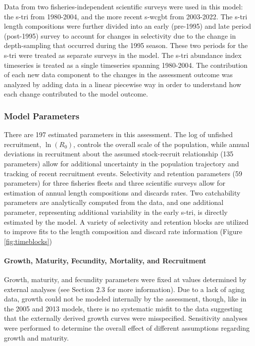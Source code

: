 \documentclass[11pt,
  english,
  letterpaper,
]{article}
\begin{document}
Data from two fisheries-independent scientific surveys were used in this model: the \gls{s-tri} from 1980-2004, and the more recent \gls{s-wcgbt} from 2003-2022. The \gls{s-tri} length compositions were further divided into an early (pre-1995) and late period (post-1995) survey to account for changes in selectivity due to the change in depth-sampling that occurred during the 1995 season. These two periods for the \gls{s-tri} were treated as separate surveys in the model. The \gls{s-tri} abundance index timeseries is treated as a single timeseries spanning 1980-2004. The contribution of each new data component to the changes in the assessment outcome was analyzed by adding data in a linear piecewise way in order to understand how each change contributed to the model outcome.

\hypertarget{model-parameters}{%
\subsubsection{Model Parameters}\label{model-parameters}}

There are 197 estimated parameters in this assessment. The log of unfished recruitment, \(\ln(R_0)\), controls the overall scale of the population, while annual deviations in recruitment about the assumed stock-recruit relationship (135 parameters) allow for additional uncertainty in the population trajectory and tracking of recent recruitment events. Selectivity and retention parameters (59 parameters) for three fisheries fleets and three scientific surveys allow for estimation of annual length compositions and discards rates. Two catchability parameters are analytically computed from the data, and one additional parameter, representing additional variability in the early \gls{s-tri}, is directly estimated by the model. A variety of selectivity and retention blocks are utilized to improve fits to the length composition and discard rate information (Figure \ref{fig:timeblocks})

\hypertarget{growth-maturity-fecundity-mortality-and-recruitment}{%
\paragraph{Growth, Maturity, Fecundity, Mortality, and Recruitment}\label{growth-maturity-fecundity-mortality-and-recruitment}}

Growth, maturity, and fecundity parameters were fixed at values determined by external analyses (see Section 2.3 for more information). Due to a lack of aging data, growth could not be modeled internally by the assessment, though, like in the 2005 and 2013 models, there is no systematic misfit to the data suggesting that the externally derived growth curves were misspecified. Sensitivity analyses were performed to determine the overall effect of different assumptions regarding growth and maturity.
\end{document}

